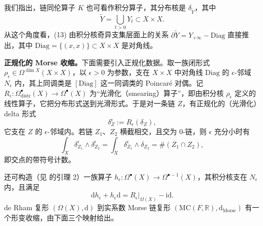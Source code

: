 我们指出，链同伦算子 $K$ 也可看作积分算子，其分布核是 $\delta_{\widetilde Y}$，其中
\begin{equation}\tag{17}\label{eq:17}
  \widetilde Y=\bigcup_{t>0}Y_t\subset X\times X.
\end{equation}
从这个角度看，(13) 由积分核奇异支集层面上的关系 $\partial\widetilde Y=Y_{+\infty}-\mathrm{Diag}$ 直接推出，其中 $\mathrm{Diag}=\{(x,x)\}\subset X\times X$ 是对角线。

\textbf{正规化的 Morse 收缩。}\quad 下面需要引入正规化数据。取一族闭形式 $\rho_\epsilon\in\Omega^{\dim X}(X\times X)$，以 $\epsilon>0$ 为参数，支在 $X\times X$ 中对角线 $\mathrm{Diag}$ 的 $\epsilon$-邻域 $N_\epsilon$ 内，其上同调类是 $[\mathrm{Diag}]$ 这一同调类的 Poincaré 对偶。记 $R_\epsilon\colon\Omega^\bullet_{\mathrm{distr}}(X)\to\Omega^\bullet(X)$ 为“光滑化（smearing）算子”，即由积分核 $\rho_\epsilon$ 定义的线性算子，它把分布形式送到光滑形式。于是对一条链 $Z$，有正规化的（光滑化）delta 形式
\[
  \delta^\epsilon_Z:=R_\epsilon(\delta_Z),
\]
它支在 $Z$ 的 $\epsilon$-邻域内。若链 $Z_1$、$Z_2$ 横截相交，且交为 0-链，则 $\epsilon$ 充分小时有
\begin{equation}\tag{18}\label{eq:18}
  \int_X\delta^\epsilon_{Z_1}\wedge\delta^\epsilon_{Z_2}
  =\int_X\delta^\epsilon_{Z_1}\wedge\delta_{Z_2}
  =\#(Z_1\cap Z_2),
\end{equation}
即交点的带符号计数。


还可构造（见 \cite[第 6.5 节]{kontsevichsoibelman} 的引理 2）一族算子 $h_\epsilon\colon\Omega^\bullet(X)\to\Omega^{\bullet-1}(X)$，其积分核支在 $N_\epsilon$ 内，且满足
\[
  \mathrm{d}h_\epsilon+h_\epsilon\mathrm{d}=R_\epsilon|_{\Omega(X)}-\mathrm{id}.
\]
de Rham 复形 $(\Omega(X),\mathrm{d})$ 到实系数 Morse 链复形 $(\mathrm{MC}(F,\mathbb R),\mathrm{d}_{\mathrm{Morse}})$ 有一个形变收缩，由下面三个映射给出。


